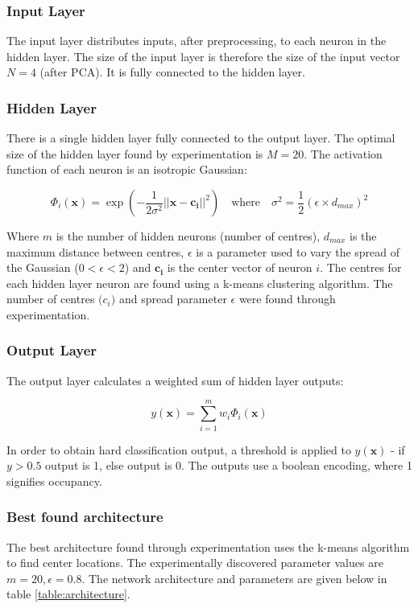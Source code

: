 \documentclass[a4paper, 11pt]{article}
\begin{document}
\subsubsection{Input Layer}
The input layer distributes inputs, after preprocessing, to each neuron in the hidden layer. The size of the input layer is therefore the size of the input vector $N=4$ (after PCA). It is fully connected to the hidden layer.

\subsubsection{Hidden Layer}
There is a single hidden layer fully connected to the output layer. The optimal size of the hidden layer found by experimentation is $M=20$. The activation function of each neuron is an isotropic Gaussian:

\begin{equation}
\Phi_i(\boldsymbol{x}) = \exp\left(-\frac{1}{2\sigma^2} \lvert\lvert \boldsymbol{x} -  \boldsymbol{c_i} \rvert\rvert ^2\right)
\quad \mathrm{where }\quad
\sigma^2 = \frac{1}{2}(\epsilon \times d_{max})^2
\label{eq:rbf}
\end{equation}


Where $m$ is the number of hidden neurons (number of centres), $d_{max}$ is the maximum distance between centres, $\epsilon$ is a parameter used to vary the spread of the Gaussian ($0<\epsilon<2$) and $\boldsymbol{c_i}$ is the center vector of neuron $i$. The centres for each hidden layer neuron are found using a k-means clustering algorithm. The number of centres $\boldsymbol(c_i)$ and spread parameter $\epsilon$ were found through experimentation.

\subsubsection{Output Layer}
The output layer calculates a weighted sum of hidden layer outputs:

\begin{equation}
y(\boldsymbol{x}) = \displaystyle\sum_{i=1}^{m} w_i \Phi_i(\boldsymbol{x})
\end{equation}


In order to obtain hard classification output, a threshold is applied to $y(\boldsymbol{x})$ - if $y>0.5$ output is 1, else output is 0. The outputs use a boolean encoding, where 1 signifies occupancy.

\subsubsection{Best found architecture}
The best architecture found through experimentation uses the k-means algorithm to find center locations. The experimentally discovered parameter values are $m = 20, \epsilon = 0.8$. The network architecture and parameters are given below in table \ref{table:architecture}.
\end{document}
